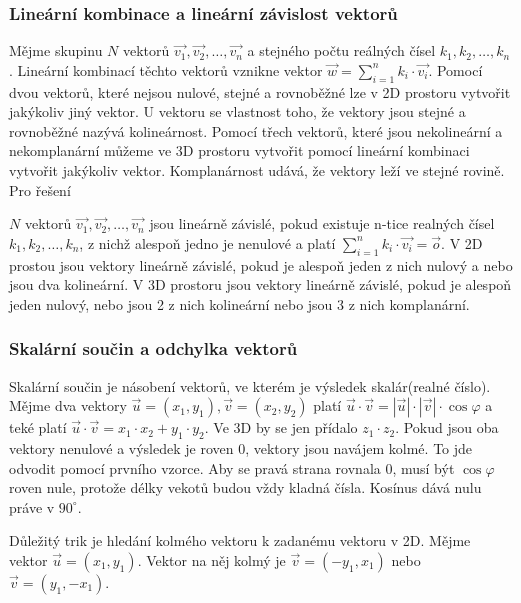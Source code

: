 \documentclass[12pt]{article}
\begin{document}
\subsubsection*{Lineární kombinace a lineární závislost vektorů}
Mějme skupinu $N$ vektorů $\vec{v_1}, \vec{v_2}, \dots, \vec{v_n}$ a stejného počtu reálných čísel
$k_1, k_2, \dots, 
k_n$. Lineární kombinací těchto vektorů vznikne vektor $\vec{w} = \sum_{i = 1}^{n} k_i \cdot
\vec{v_i}$. Pomocí dvou vektorů, které nejsou nulové, stejné a rovnoběžné lze v 2D prostoru vytvořit
jakýkoliv jiný vektor. U vektoru se vlastnost toho, že vektory jsou stejné a rovnoběžné nazývá
kolineárnost. Pomocí třech vektorů, které jsou nekolineární a nekomplanární můžeme ve 3D prostoru
vytvořit pomocí lineární kombinaci vytvořit jakýkoliv vektor. Komplanárnost udává, že vektory
leží ve stejné rovině. Pro řešení

$N$ vektorů $\vec{v_1}, \vec{v_2}, \dots, \vec{v_n}$ jsou lineárně závislé, pokud existuje n-tice
realných čísel $k_1, k_2, \dots, k_n$, z nichž alespoň jedno je nenulové a platí $\sum_{i = 1}^{n}
k_i \cdot \vec{v_i} = \vec{o}$. V 2D prostou jsou vektory lineárně závislé, pokud je alespoň jeden z
nich nulový a nebo jsou dva kolineární. V 3D prostoru jsou vektory lineárně závislé, pokud je alespoň
jeden nulový, nebo jsou 2 z nich kolineární nebo jsou 3 z nich komplanární.

\subsubsection*{Skalární součin a odchylka vektorů}
Skalární součin je násobení vektorů, ve kterém je výsledek skalár(realné číslo). Mějme dva vektory
$\vec{u} = (x_1, y_1), \vec{v} = (x_2, y_2)$ platí $\vec{u} \cdot \vec{v} = |\vec{u}| \cdot |\vec{v}|
\cdot \cos \varphi$ a teké platí $\vec{u} \cdot \vec{v} = x_1 \cdot x_2 + y_1 \cdot
y_2$. Ve 3D by se jen přídalo $z_1 \cdot z_2$.
Pokud jsou oba vektory nenulové a výsledek je roven 0, vektory jsou navájem kolmé. To jde
odvodit pomocí prvního vzorce. Aby se pravá strana rovnala 0, musí být $\cos \varphi$ roven nule,
protože délky vekotů budou vždy kladná čísla. Kosínus dává nulu práve v $90^\circ$.

Důležitý trik je hledání kolmého vektoru k zadanému vektoru v 2D. Mějme vektor $\vec{u} = (x_1,
y_1)$. Vektor na něj kolmý je $\vec{v} = (-y_1, x_1)$ nebo $\vec{v} = (y_1, -x_1)$.
\end{document}
